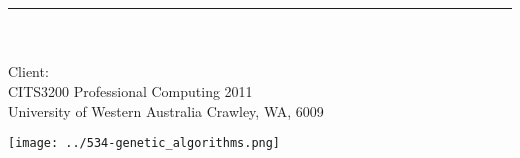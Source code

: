 
{}


\begin{titlepage}

\begin{center}

\vspace{1cm}

\textsc{\LARGE \getprojectname}\\[0.5cm]
\textsc{\huge \gettitle}\\[0.5cm]
\rule{0.9\textwidth}{0.7pt} \\[0.75cm]
\emph{\getauthor} \\[0.5cm]
Client: \emph{\getclient} \\[0.5cm]

CITS3200 Professional Computing 2011 \\
University of Western Australia Crawley, WA, 6009

\vspace{2cm}
\texttt{[image: ../534-genetic\_algorithms.png]} \\

\end{center}

\end{titlepage}

